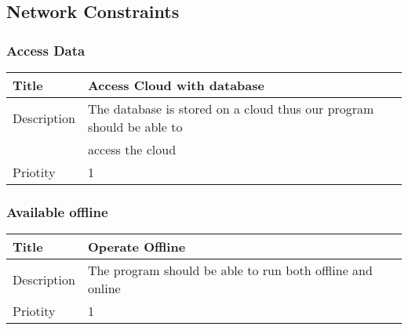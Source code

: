 \documentclass{article}
\begin{document}
    
	\subsection{Network Constraints}
		\subsubsection{Access Data}
			\begin{table}[h!]
			\centering
				\label{system-constraints/hardware/computation-table}
				\begin{tabular}{|l|l|}
				\hline
					Title		&Access Cloud with database \\ \hline
					Description	&The database is stored on a cloud thus our program should be able to  \ \ \\
							& access the cloud \\ \hline
					Priotity	&1  \\ \hline
				\end{tabular}
			\end{table}
  		\subsubsection{Available offline}
			\begin{table}[h!]
			\centering
				\label{system-constraints/hardware/computation-table}
				\begin{tabular}{|l|l|}
				\hline
					Title		&Operate Offline \\ \hline
					Description	&The program should be able to run both offline and online\ \ \ \ \ \ \ \ \ \ \ \ \ \ \ \ \\ \hline

					Priotity	&1  \\ \hline
				\end{tabular}
			\end{table}
\end{document}
